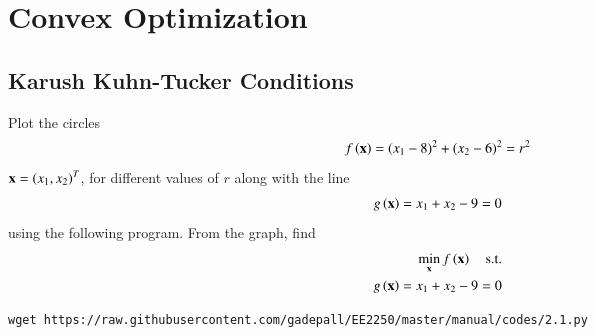 \documentclass[journal,12pt,twocolumn]{IEEEtran}
\begin{document}
\section{Convex Optimization}
\subsection{Karush Kuhn-Tucker Conditions}

\begin{problem}
	\label{convex_code}
	Plot the circles 
%
\begin{equation}
\label{eq2_1_circ}
f\left(\mathbf{x}\right) = (x_1-8)^2 + (x_2-6)^2 = r^2
\end{equation}
%
 $\mathbf{x}= \left(x_1,x_2\right)^{T}$, for different values of $r$ along with the line 
%
\begin{equation}
\label{eq2_1_line}
g\left(\mathbf{x}\right) = x_1 + x_2 - 9 = 0
\end{equation} 
%
using the following program.	From the graph, find
\begin{align}
	\min_{\mathbf{x}}f\left(\mathbf{x}\right) \quad \text{s.t.} \\
	g\left(\mathbf{x}\right) = x_1 + x_2 - 9 = 0
\end{align}
%
\end{problem}
%	
\begin{lstlisting}
wget https://raw.githubusercontent.com/gadepall/EE2250/master/manual/codes/2.1.py
\end{lstlisting}
\end{document}
